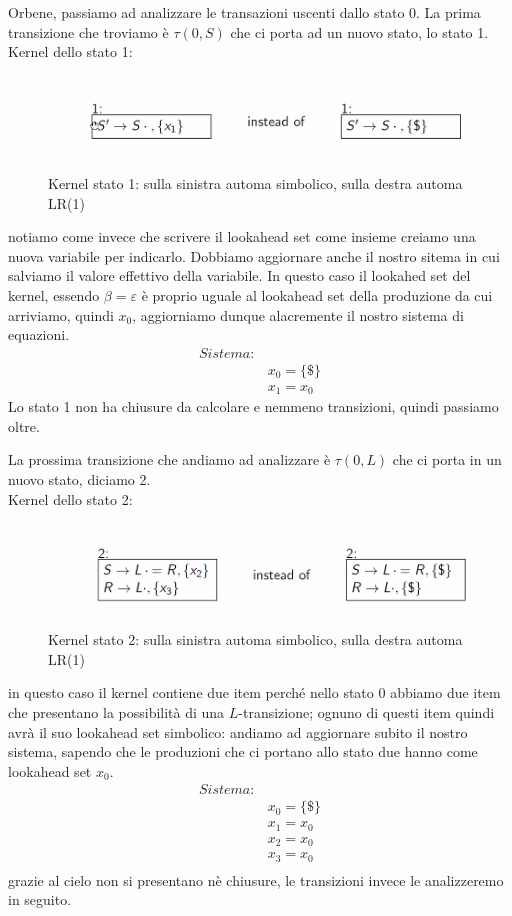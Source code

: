 \documentclass[class=book, crop=false, oneside, 12pt]{standalone}
\begin{document}
Orbene, passiamo ad analizzare le transazioni uscenti dallo stato 0.
La prima transizione che troviamo è \(\tau(0,S)\) che ci porta ad un nuovo stato, lo stato 1.
\\
Kernel dello stato 1:
\begin{figure}
    \centering
    \includegraphics[width=.7\textwidth]{ex_automa_simbolic-kernel_s1.png}
    \caption{Kernel stato 1: sulla sinistra automa simbolico, sulla destra automa LR(1)}
\end{figure}
notiamo come invece che scrivere il lookahead set come insieme creiamo una nuova variabile per indicarlo. Dobbiamo aggiornare anche il nostro sitema in cui salviamo il valore effettivo della variabile.
In questo caso il lookahed set del kernel, essendo \(\beta = \varepsilon\) è proprio uguale al lookahead set della produzione da cui arriviamo, quindi \(x_0\), aggiorniamo dunque alacremente il nostro sistema di equazioni.
\begin{align*}
    Sistema:& \\
            & x_0 = \{\$\} \\
            & x_1 = x_0
\end{align*}
Lo stato 1 non ha chiusure da calcolare e nemmeno transizioni, quindi passiamo oltre.

La prossima transizione che andiamo ad analizzare è \(\tau(0,L)\) che ci porta in un nuovo stato, diciamo 2.
\\
Kernel dello stato 2:
\begin{figure}
    \centering
    \includegraphics[width=.7\textwidth]{ex_automa_simbolico-kernel_s2.png}
    \caption{Kernel stato 2: sulla sinistra automa simbolico, sulla destra automa LR(1)}
\end{figure}
in questo caso il kernel contiene due item perché nello stato 0 abbiamo due item che presentano la possibilità di una \(L\)-transizione; ognuno di questi item quindi avrà il suo lookahead set simbolico: andiamo ad aggiornare subito il nostro sistema, sapendo che le produzioni che ci portano allo stato due hanno come lookahead set \(x_0\).
\begin{align*}
    Sistema:& \\
            & x_0 = \{\$\} \\
            & x_1 = x_0 \\
            & x_2 = x_0 \\
            & x_3 = x_0 \\
\end{align*}
grazie al cielo non si presentano nè chiusure, le transizioni invece le analizzeremo in seguito.
\end{document}
